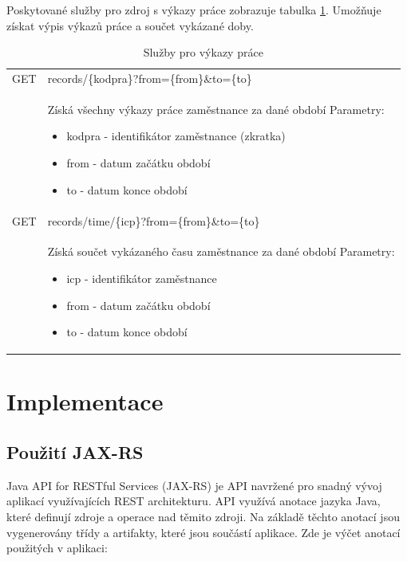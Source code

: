 \documentclass{diplomka}
\begin{document}
\noindent
Poskytované služby pro zdroj s výkazy práce zobrazuje tabulka \ref{tab:urirecords}. Umožňuje získat výpis výkazů práce a součet vykázané doby.
\begin{table}[H]
\begin{center}
\begin{tabular}{| m{2cm} |  m{10cm} |}
\hline
\rowcolor{Gray}
GET  &records/\{kodpra\}?from=\{from\}\&to=\{to\} \\ 
&  \parbox{10cm}{\vspace{5 mm}Získá všechny výkazy práce zaměstnance za dané období\\
Parametry:\begin{itemize}[noitemsep,nolistsep]
\item kodpra - identifikátor zaměstnance (zkratka)
\item from - datum začátku období
\item to - datum konce období
\end{itemize}
\vspace{5 mm}} \\ \hline
{}
GET & records/time/\{icp\}?from=\{from\}\&to=\{to\} \\ \hline
&  \parbox{10cm}{\vspace{5 mm}Získá součet vykázaného času zaměstnance za dané období\\
Parametry:\begin{itemize}[noitemsep,nolistsep]
\item icp - identifikátor zaměstnance
\item from - datum začátku období
\item to - datum konce období
\end{itemize}
\vspace{5 mm}} \\ \hline
\end{tabular}
\end{center}
\caption{Služby pro výkazy práce}
\label{tab:urirecords}
\end{table}



\section{Implementace}
\subsection{Použití JAX-RS}
Java API for RESTful Services (JAX-RS) je API navržené pro snadný vývoj aplikací využívajících REST architekturu. API využívá anotace jazyka Java, které definují zdroje a operace nad těmito zdroji. Na základě těchto anotací jsou vygenerovány třídy a artifakty, které jsou součástí aplikace. Zde je výčet anotací použitých v aplikaci:
\end{document}
